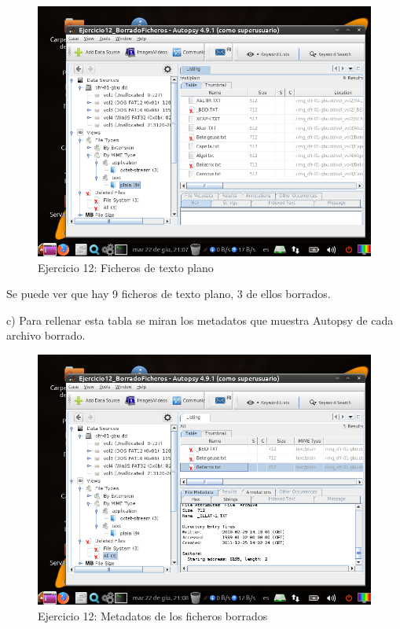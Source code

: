 \documentclass[11pt]{article}
\begin{document}
\begin{figure}[H]
    \caption{Ejercicio 12: Ficheros de texto plano}
    \centering
    \includegraphics[scale=0.7]{e12-6.png}
\end{figure}

Se puede ver que hay 9 ficheros de texto plano, 3 de ellos borrados.

c) Para rellenar esta tabla se miran los metadatos que muestra Autopsy de cada archivo borrado.

\begin{figure}[H]
    \caption{Ejercicio 12: Metadatos de los ficheros borrados}
    \centering
    \includegraphics[scale=0.7]{e12-7.png}
\end{figure}
\end{document}

